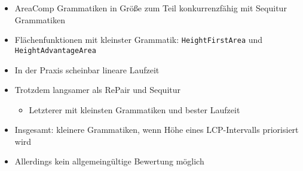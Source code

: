 \begin{frame}
	\begin{itemize}
		\item<1-> AreaComp Grammatiken in Größe zum Teil konkurrenzfähig mit Sequitur Grammatiken
		\item<1-> Flächenfunktionen mit kleinster Grammatik: \texttt{HeightFirstArea} und \texttt{HeightAdvantageArea}
		\item<2-> In der Praxis scheinbar lineare Laufzeit
		\item<3-> Trotzdem langsamer als RePair und Sequitur \begin{itemize}
			\item Letzterer mit kleinsten Grammatiken und bester Laufzeit
		\end{itemize} 
		\item<4-> Insgesamt: kleinere Grammatiken, wenn Höhe eines LCP-Intervalls priorisiert wird
		\item<5-> Allerdings kein allgemeingültige Bewertung möglich
	\end{itemize}

\end{frame}